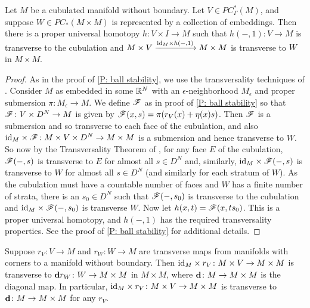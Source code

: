 \begin{lemma}\label{L: product transversal}
	Let $M$ be a cubulated manifold without boundary.
	Let $V \in PC^*_{\Gamma}(M)$, and suppose $W \in PC_*(M \times M)$ is represented by a collection of embeddings.
	Then there is a proper universal homotopy $h \colon V \times I \to M$ such that $h(-,1) \colon V \to M$ is transverse to the cubulation and $M \times V \xrightarrow{\mathrm{id}_M \times h(-,1)} M \times M$ is transverse to $W$ in $M \times M$.
\end{lemma}

\begin{proof}
	As in the proof of \cref{P: ball stability}, we use the transversality techniques of \cite[Section 2.3]{GuPo74}.
	Consider $M$ as embedded in some $\mathbb{R}^N$ with an $\epsilon$-neighborhood $M_\epsilon$ and proper submersion $\pi \colon M_\epsilon \to M$.
	We define $\mathscr{F}$ as in proof of \cref{P: ball stability} so that $\mathscr{F} \colon V \times D^N \to M$ is given by $\mathscr{F}(x,s) = \pi(r_V(x)+\eta(x)s)$.
	Then $\mathscr{F}$ is a submersion and so transverse to each face of the cubulation, and also $\mathrm{id}_M \times \mathscr{F} \colon M \times V \times D^N \to M \times M$ is a submersion and hence transverse to $W$.
	So now by the Transversality Theorem of \cite[Section 2.3]{GuPo74}, for any face $E$ of the cubulation, $\mathscr{F}(-,s)$ is transverse to $E$ for almost all $s \in D^N$ and, similarly, $\mathrm{id}_M \times \mathscr{F}(-,s)$ is transverse to $W$ for almost all $s \in D^N$ (and similarly for each stratum of $W$).
	As the cubulation must have a countable number of faces and $W$ has a finite number of strata, there is an $s_0 \in D^N$ such that $\mathscr{F}(-,s_0)$ is transverse to the cubulation and $\mathrm{id}_M \times \mathscr{F}(-,s_0)$ is transverse $W$.
	Now let $h(x,t) = \mathscr{F}(x,ts_0)$.
	This is a proper universal homotopy, and $h(-,1)$ has the required transversality properties.
	See the proof of \cref{P: ball stability} for additional details.
\end{proof}

\begin{lemma}\label{L: M times transverse diag}
	Suppose $r_V \colon V \to M$ and $r_W \colon W \to M$ are transverse maps from manifolds with corners to a manifold without boundary.
	Then $\mathrm{id}_M \times r_V \colon M \times V \to M \times M$ is transverse to $\mathbf{d} r_W \colon W \to M \times M$ in $M \times M$, where $\mathbf{d} \colon M \to M \times M$ is the diagonal map.
	In particular, $\mathrm{id}_M \times r_V \colon M \times V \to M \times M$ is transverse to $\mathbf{d} \colon M \to M \times M$ for any $r_V$.
\end{lemma}


